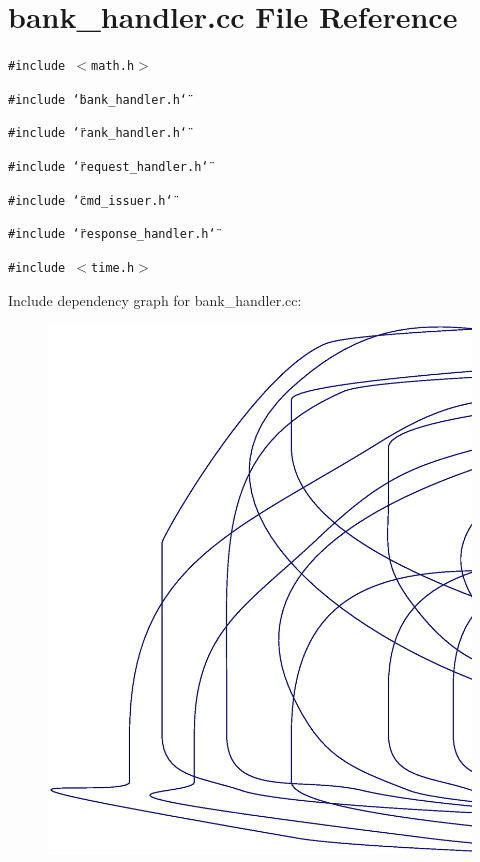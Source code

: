 \section{bank\_\-handler.cc File Reference}
\label{bank__handler_8cc}
{\tt \#include $<$math.h$>$}\par
{\tt \#include \char`\"{}bank\_\-handler.h\char`\"{}}\par
{\tt \#include \char`\"{}rank\_\-handler.h\char`\"{}}\par
{\tt \#include \char`\"{}request\_\-handler.h\char`\"{}}\par
{\tt \#include \char`\"{}cmd\_\-issuer.h\char`\"{}}\par
{\tt \#include \char`\"{}response\_\-handler.h\char`\"{}}\par
{\tt \#include $<$time.h$>$}\par


Include dependency graph for bank\_\-handler.cc:\nopagebreak
\begin{figure}[H]
\begin{center}
\leavevmode
\includegraphics[width=420pt]{bank__handler_8cc__incl}
\end{center}
\end{figure}
